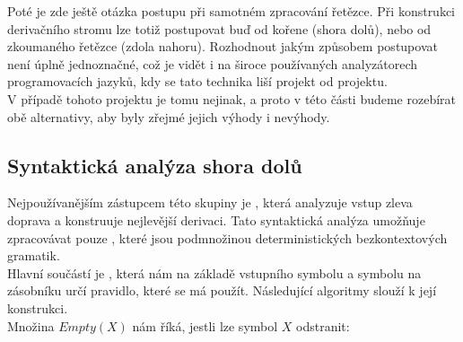 Poté je zde ještě otázka postupu při samotném zpracování řetězce.
Při konstrukci derivačního stromu lze totiž postupovat buď od kořene (shora dolů), nebo od
zkoumaného řetězce (zdola nahoru). Rozhodnout jakým způsobem postupovat není úplně jednoznačné,
což je vidět i na široce používaných analyzátorech programovacích jazyků,
kdy se tato technika liší projekt od projektu.\\

V případě tohoto projektu je tomu nejinak, a proto v této části budeme rozebírat
obě alternativy, aby byly zřejmé jejich výhody i nevýhody.

\subsection{Syntaktická analýza shora dolů}

Nejpoužívanějším zástupcem této skupiny je , která analyzuje
vstup zleva doprava a konstruuje nejlevější derivaci. Tato syntaktická analýza
umožňuje zpracovávat pouze ,
které jsou podmnožinou deterministických bezkontextových gramatik.\\

Hlavní součástí je , která nám na základě
vstupního symbolu a symbolu na zásobníku určí pravidlo, které se má použít.
Následující algoritmy slouží k její konstrukci.\\

\noindent
Množina $Empty(X)$ nám říká, jestli lze symbol $X$ odstranit:\\
\begin{algorithm}[H]
  \caption{$Empty(X)$}

  \BlankLine
\end{algorithm}
\vspace{0.5cm}

